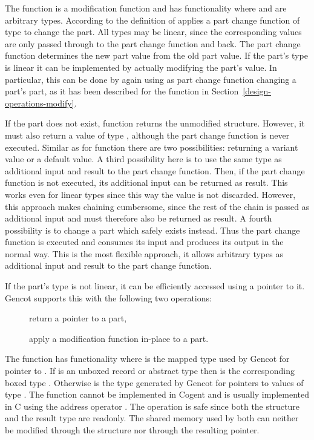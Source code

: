 The function  is a modification function and has functionality  where 
 and  are arbitrary types.
According to the definition of   applies a part change function of
type  to change the part. All types may be linear, since the corresponding values are
only passed through to the part change function and back.
The part change function determines the new part value from the old part value. If the part's type 
is linear it can be implemented by actually modifying the part's value. In particular, this can be done by
again using  as part change function changing a part's part, as it has been described
for the  function in Section~\ref{design-operations-modify}.

If the part does not exist, function  returns the unmodified structure. However, it must also
return a value of type , although the part change function is never executed. Similar as for 
function  there are two possibilities: returning a variant value or a default value. A third
possibility here is to use the same type  as additional input and result to the part change
function. Then, if the part change function is not executed, its additional input can be returned
as result. This works even for linear types  since this way the value is not discarded. However,
this approach makes chaining cumbersome, since the rest of the chain is passed as additional input and
must therefore also be returned as result. A fourth
possibility is to change a part which safely exists instead. Thus the part change function is executed and
consumes its input and produces its output in the normal way. This is the most flexible approach, it allows
arbitrary types as additional input and result to the part change function.

If the part's type  is not linear, it can be efficiently accessed using a pointer to it.
Gencot supports this with the following two operations:
\begin{description}
  \item[] return a pointer to a part,
  \item[] apply a modification function in-place to a part.
\end{description}

The function  has functionality  where  is the mapped type used by Gencot
for pointer to . If  is an unboxed record or abstract type  then  is the
corresponding boxed type . Otherwise  is the type  generated by Gencot for pointers
to values of type . The function cannot be implemented in Cogent and is usually implemented in C using the address 
operator \code{\&}. The operation is safe since both the structure and the result type are readonly. The shared
memory used by both can neither be modified through the structure nor through the resulting pointer. 

